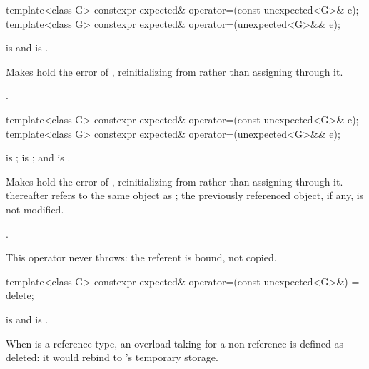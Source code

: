 %
\begin{itemdecl}
template<class G>
  constexpr expected& operator=(const unexpected<G>& e);
template<class G>
  constexpr expected& operator=(unexpected<G>&& e);
\end{itemdecl}

\begin{itemdescr}
\pnum
\constraints
{} is  and  is .

\pnum
\effects
Makes  hold the error of , reinitializing  from  rather than assigning through it.

\pnum
\returns
{}.
\end{itemdescr}

%
\begin{itemdecl}
template<class G>
  constexpr expected& operator=(const unexpected<G>& e);
template<class G>
  constexpr expected& operator=(unexpected<G>&& e);
\end{itemdecl}

\begin{itemdescr}
\pnum
\constraints
{} is ;  is ; and  is .

\pnum
\effects
Makes  hold the error of , reinitializing  from  rather than assigning through it.  thereafter refers to the same object as ; the previously referenced object, if any, is not modified.

\pnum
\returns
{}.

\pnum
\remarks
This operator never throws: the referent is bound, not copied.
\end{itemdescr}

%
\begin{itemdecl}
template<class G>
  constexpr expected& operator=(const unexpected<G>&) = delete;
\end{itemdecl}

\begin{itemdescr}
\pnum
\constraints
{} is  and  is .

\pnum
\remarks
When  is a reference type, an overload taking  for a non-reference  is defined as deleted: it would rebind  to 's temporary storage.
\end{itemdescr}

